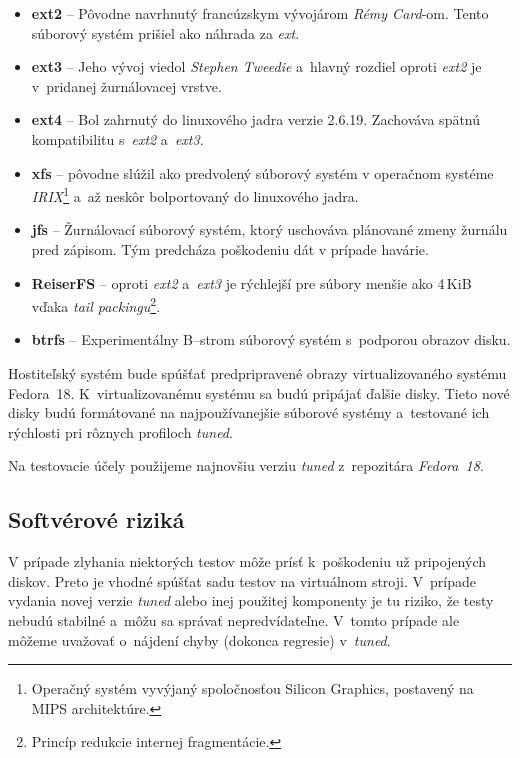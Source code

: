\begin{itemize}
    \item \textbf{ext2} -- Pôvodne navrhnutý francúzskym vývojárom \emph{Rémy
    Card}-om. Tento súborový systém prišiel ako náhrada za \emph{ext}.
    \item \textbf{ext3} -- Jeho vývoj viedol \emph{Stephen Tweedie} a~hlavný
    rozdiel oproti \emph{ext2} je v~pridanej žurnálovacej vrstve.
    \item \textbf{ext4} -- Bol zahrnutý do linuxového jadra verzie 2.6.19.
    Zachováva spätnú kompatibilitu s~\emph{ext2} a~\emph{ext3}.
    \item \textbf{xfs} -- pôvodne slúžil ako predvolený súborový systém v
    operačnom systéme \emph{IRIX}\footnote{Operačný systém vyvýjaný
    spoločnosťou Silicon Graphics, postavený na MIPS architektúre.} a~až neskôr
    bolportovaný do linuxového jadra.
    \item \textbf{jfs} -- Žurnálovací súborový systém, ktorý uschováva
    plánované zmeny žurnálu pred zápisom. Tým predcháza poškodeniu dát v
    prípade havárie.
    \item \textbf{ReiserFS} -- oproti \emph{ext2} a~\emph{ext3} je rýchlejší
    pre súbory menšie ako 4\,KiB vďaka \emph{tail packingu}\footnote{Princíp
    redukcie internej fragmentácie.}.
    \item \textbf{btrfs} -- Experimentálny B--strom súborový systém s~podporou
    obrazov disku.
\end{itemize}

Hostiteľský systém bude spúšťať predpripravené obrazy virtualizovaného systému
Fedora~18. K~virtualizovanému systému sa budú pripájať ďalšie disky. Tieto nové
disky budú formátované na najpoužívanejšie súborové systémy a~testované ich
rýchlosti pri rôznych profiloch \emph{tuned}.

Na testovacie účely použijeme najnovšiu verziu \emph{tuned} z~repozitára
\emph{Fedora~18}.

\subsection*{Softvérové riziká}
\label{sec:softverove-rizika}

V prípade zlyhania niektorých testov môže prísť k~poškodeniu už pripojených
diskov. Preto je vhodné spúšťat sadu testov na virtuálnom stroji. V~prípade
vydania novej verzie \emph{tuned} alebo inej použitej komponenty je tu riziko,
že testy nebudú stabilné a~môžu sa správať nepredvídateľne. V~tomto prípade ale
môžeme uvažovať o~nájdení chyby (dokonca regresie) v~\emph{tuned}.


